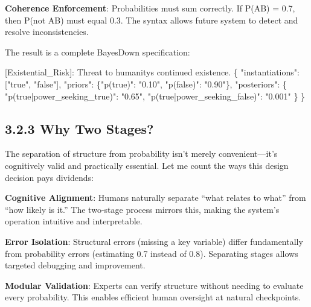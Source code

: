 \documentclass[
  11pt,
  letterpaper,
]{book}
\newenvironment{Shaded}{\begin{snugshade}}{\end{snugshade}}
\newcommand{\DataTypeTok}[1]{\textcolor[rgb]{0.68,0.00,0.00}{#1}}
\newcommand{\ErrorTok}[1]{\textcolor[rgb]{0.68,0.00,0.00}{#1}}
\newcommand{\FunctionTok}[1]{\textcolor[rgb]{0.28,0.35,0.67}{#1}}
\newcommand{\OtherTok}[1]{\textcolor[rgb]{0.00,0.23,0.31}{#1}}
\newcommand{\StringTok}[1]{\textcolor[rgb]{0.13,0.47,0.30}{#1}}
\begin{document}
\textbf{Coherence Enforcement}: Probabilities must sum correctly. If
P(A\textbar B) = 0.7, then P(not A\textbar B) must equal 0.3. The syntax
allows future system to detect and resolve inconsistencies.

The result is a complete BayesDown specification:

\begin{Shaded}
\begin{Highlighting}[]
\OtherTok{[}\ErrorTok{Existential\_Risk}\OtherTok{]}\ErrorTok{:} \ErrorTok{Threat} \ErrorTok{to} \ErrorTok{humanity\textquotesingle{}s} \ErrorTok{continued} \ErrorTok{existence.} \FunctionTok{\{}
  \DataTypeTok{"instantiations"}\FunctionTok{:} \OtherTok{[}\StringTok{"true"}\OtherTok{,} \StringTok{"false"}\OtherTok{]}\FunctionTok{,}
  \DataTypeTok{"priors"}\FunctionTok{:} \FunctionTok{\{}\DataTypeTok{"p(true)"}\FunctionTok{:} \StringTok{"0.10"}\FunctionTok{,} \DataTypeTok{"p(false)"}\FunctionTok{:} \StringTok{"0.90"}\FunctionTok{\},}
  \DataTypeTok{"posteriors"}\FunctionTok{:} \FunctionTok{\{}
    \DataTypeTok{"p(true|power\_seeking\_true)"}\FunctionTok{:} \StringTok{"0.65"}\FunctionTok{,}
    \DataTypeTok{"p(true|power\_seeking\_false)"}\FunctionTok{:} \StringTok{"0.001"}
  \FunctionTok{\}}
\FunctionTok{\}}
\end{Highlighting}
\end{Shaded}

\subsection{3.2.3 Why Two Stages?}\label{sec-why-two-stages}

The separation of structure from probability isn't merely
convenient---it's cognitively valid and practically essential. Let me
count the ways this design decision pays dividends:

\textbf{Cognitive Alignment}: Humans naturally separate ``what relates
to what'' from ``how likely is it.'' The two-stage process mirrors this,
making the system's operation intuitive and interpretable.

\textbf{Error Isolation}: Structural errors (missing a key variable)
differ fundamentally from probability errors (estimating 0.7 instead of
0.8). Separating stages allows targeted debugging and improvement.

\textbf{Modular Validation}: Experts can verify structure without
needing to evaluate every probability. This enables efficient human
oversight at natural checkpoints.
\end{document}
